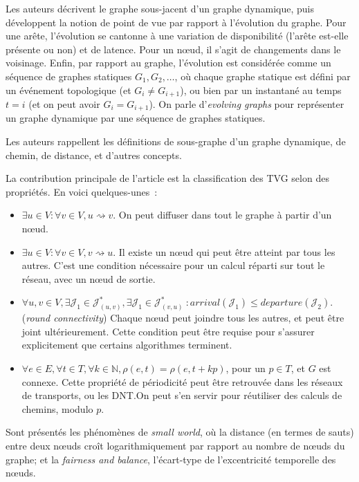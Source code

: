 \documentclass[12pt,a4paper]{article}
\begin{document}
Les auteurs décrivent le graphe sous-jacent d'un graphe dynamique,
puis développent la notion de point de vue par rapport à l'évolution
du graphe. Pour une arête, l'évolution se cantonne à une variation de
disponibilité (l'arête est-elle présente ou non) et de latence. Pour
un nœud, il s'agit de changements dans le voisinage. Enfin, par
rapport au graphe, l'évolution est considérée comme un séquence de
graphes statiques \(G_1, G_2, \dots\), où chaque graphe statique est
défini par un événement topologique (et \(G_i \neq G_{i+1}\)), ou bien
par un instantané au temps \(t = i\) (et on peut avoir
\(G_i = G_{i+1}\)). On parle d'\textit{evolving graphs} pour
représenter un graphe dynamique par une séquence de graphes statiques.

Les auteurs rappellent les définitions de sous-graphe d'un graphe
dynamique, de chemin, de distance, et d'autres concepts.

La contribution principale de l'article est la classification des TVG
selon des propriétés. En voici quelques-unes~:

\begin{itemize}
\item \(\exists u \in V : \forall v \in V, u \rightsquigarrow v\). On
  peut diffuser dans tout le graphe à partir d'un nœud.
\item \(\exists u \in V : \forall v \in V, v \rightsquigarrow u\). Il
  existe un nœud qui peut être atteint par tous les autres. C'est une
  condition nécessaire pour un calcul réparti sur tout le réseau, avec
  un nœud de sortie.
\item
  \(\forall u, v \in V, \exists \mathcal{J}_1 \in
  \mathcal{J}^*_{(u,v)}, \exists \mathcal{J}_1 \in
  \mathcal{J}^*_{(v,u)}~: arrival(\mathcal{J}_1) \leq
  departure(\mathcal{J}_2)\). (\textit{round connectivity}) Chaque
  nœud peut joindre tous les autres, et peut être joint
  ultérieurement. Cette condition peut être requise pour s'assurer
  explicitement que certains algorithmes terminent.
\item
  \(\forall e \in E, \forall t \in T, \forall k \in \mathbb{N},
  \rho(e, t) = \rho(e, t + kp)\), pour un \(p \in T\), et \(G\) est
  connexe. Cette propriété de périodicité peut être retrouvée dans les
  réseaux de transports, ou les DNT.\@ On peut s'en servir pour
  réutiliser des calculs de chemins, modulo \(p\).
\end{itemize}

Sont présentés les phénomènes de \textit{small world}, où la distance
(en termes de sauts) entre deux nœuds croît logarithmiquement par
rapport au nombre de nœuds du graphe; et la \textit{fairness and
  balance}, l'écart-type de l'excentricité temporelle des nœuds.\\
\end{document}
